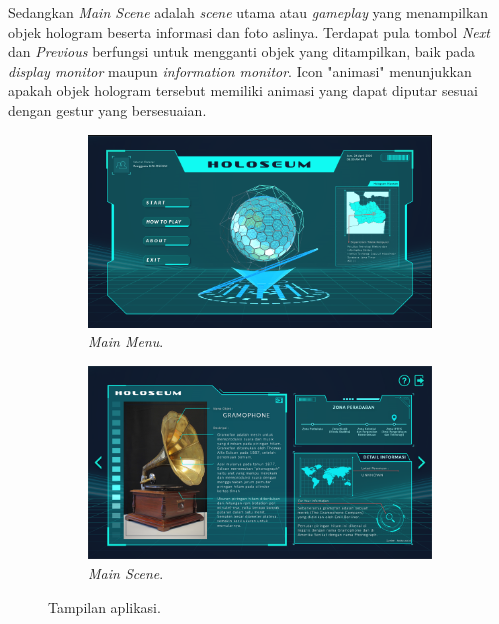 \documentclass[conference]{IEEEtran}
\begin{document}
		Sedangkan \textit{Main Scene} adalah \textit{scene} utama atau \textit{gameplay} yang menampilkan objek hologram beserta informasi dan foto aslinya. Terdapat pula tombol \textit{Next} dan \textit{Previous} berfungsi untuk mengganti objek yang ditampilkan, baik pada \textit{display monitor} maupun \textit{information monitor}. Icon "animasi" menunjukkan apakah objek hologram tersebut memiliki animasi yang dapat diputar sesuai dengan gestur yang bersesuaian. 
		\begin{figure} [h]
			\begin{subfigure}[t]{0.23\textwidth}
				\includegraphics[width=\textwidth]{img/mainmenu.png}
				\caption{\textit{Main Menu}.\label{fig:mainmenu}}
			\end{subfigure}
			\hspace{0.1em}
			\begin{subfigure}[t]{0.23\textwidth}
				\includegraphics[width=\textwidth]{img/mainscene.png}
				\caption{\textit{Main Scene}.\label{fig:mainscene}}
			\end{subfigure}
			\vspace{-1ex}
			\caption{Tampilan aplikasi.}
		\end{figure}
		\vspace{-2ex}
	
\end{document}

